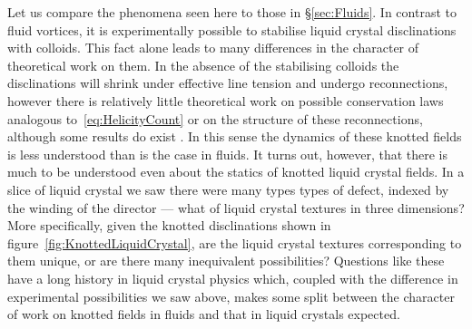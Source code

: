 Let us compare the phenomena seen here to those in \S\ref{sec:Fluids}. In contrast to fluid vortices, it is experimentally possible to stabilise liquid crystal disclinations with colloids. This fact alone leads to many differences in the character of theoretical work on them. In the absence of the stabilising colloids the disclinations will shrink under effective line tension and undergo reconnections, however there is relatively little theoretical work on possible conservation laws analogous to~\eqref{eq:HelicityCount} or on the structure of these reconnections, although some results do exist \citep{Copar2011,Machon2017}. In this sense the dynamics of these knotted fields is less understood than is the case in fluids. It turns out, however, that there is much to be understood even about the statics of knotted liquid crystal fields. In a slice of liquid crystal we saw there were many types types of defect, indexed by the winding of the director --- what of liquid crystal textures in three dimensions? More specifically, given the knotted disclinations shown in figure~\ref{fig:KnottedLiquidCrystal}, are the liquid crystal textures corresponding to them unique, or are there many inequivalent possibilities? Questions like these have a long history in liquid crystal physics which, coupled with the difference in experimental possibilities we saw above, makes some split between the character of work on knotted fields in fluids and that in liquid crystals expected.

